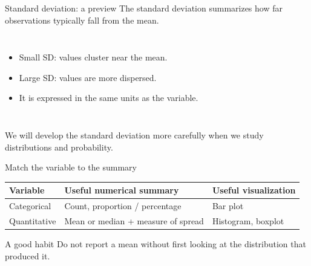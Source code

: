 \documentclass[11pt,aspectratio=169]{beamer}
\begin{document}
\begin{frame}{Standard deviation: a preview}
The \alert{standard deviation} summarizes how far observations typically fall from the mean.

\vspace{0.7em}
\begin{columns}[c,onlytextwidth]
\begin{itemize}
  \item Small SD: values cluster near the mean.
  \item Large SD: values are more dispersed.
  \item It is expressed in the same units as the variable.
\end{itemize}
\centering
{}
\end{columns}
\vfill
\footnotesize We will develop the standard deviation more carefully when we study distributions and probability.
\end{frame}

\begin{frame}{Match the variable to the summary}
\small
\begin{center}
\begin{tabular}{>{\raggedright\arraybackslash}p{} >{\raggedright\arraybackslash}p{} >{\raggedright\arraybackslash}p{}}
\toprule
\textbf{Variable} & \textbf{Useful numerical summary} & \textbf{Useful visualization} \\
\midrule
Categorical & Count, proportion / percentage & Bar plot \\
\addlinespace
Quantitative & Mean or median + measure of spread & Histogram, boxplot \\
\bottomrule
\end{tabular}
\end{center}

\vspace{0.9em}
\begin{alertblock}{A good habit}
Do not report a mean without first looking at the distribution that produced it.
\end{alertblock}
\end{frame}
\end{document}
